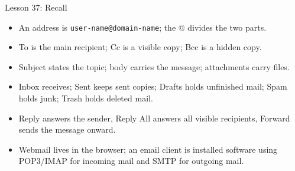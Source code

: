 \documentclass[aspectratio=169]{beamer}
\begin{document}
\begin{frame}{Lesson 37: Recall}
  \begin{itemize}
    \item An address is \texttt{user-name@domain-name}; the @ divides the two
      parts.
    \item To is the main recipient; Cc is a visible copy; Bcc is a hidden copy.
    \item Subject states the topic; body carries the message; attachments carry files.
    \item Inbox receives; Sent keeps sent copies; Drafts holds unfinished mail;
      Spam holds junk; Trash holds deleted mail.
    \item Reply answers the sender, Reply All answers all visible recipients,
      Forward sends the message onward.
    \item Webmail lives in the browser; an email client is installed software
      using POP3/IMAP for incoming mail and SMTP for outgoing mail.
  \end{itemize}
\end{frame}
\end{document}
